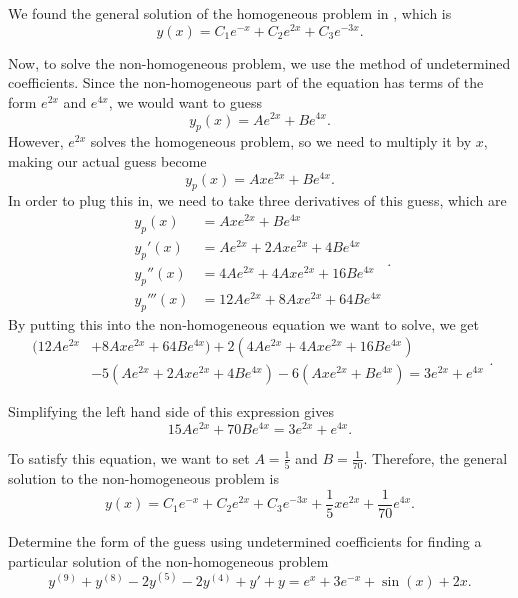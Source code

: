 \documentclass{ximera}
\begin{document}
\begin{exampleSol}
    We found the general solution of the homogeneous problem in , which is 
    \[ 
        y(x) = C_1 e^{-x} + C_2 e^{2x}+ C_3e^{-3x}. 
    \]
    
    Now, to solve the non-homogeneous problem, we use the method of undetermined coefficients. Since the non-homogeneous part of the equation has terms of the form $e^{2x}$ and $e^{4x}$, we would want to guess 
    \[ 
        y_p(x) = Ae^{2x} + Be^{4x}.
    \] 
    However, $e^{2x}$ solves the homogeneous problem, so we need to multiply it by $x$, making our actual guess become 
    \[ 
        y_p(x) = Axe^{2x} + Be^{4x}.
    \] 
    In order to plug this in, we need to take three derivatives of this guess, which are
    \[ 
        \begin{split}
            y_p(x) &= Axe^{2x} + Be^{4x} \\
            y_p'(x) &= Ae^{2x} + 2Axe^{2x} + 4Be^{4x} \\
            y_p''(x) &= 4Ae^{2x} + 4Axe^{2x} + 16Be^{4x} \\
            y_p'''(x) &= 12Ae^{2x} + 8Axe^{2x} + 64Be^{4x}
        \end{split}.
    \]
    By putting this into the non-homogeneous equation we want to solve, we get
    \[
        \begin{split}
            (12Ae^{2x} &+ 8Axe^{2x} + 64Be^{4x}) + 2(4Ae^{2x} + 4Axe^{2x} + 16Be^{4x})\\
             & - 5(Ae^{2x} + 2Axe^{2x} + 4Be^{4x}) - 6(Axe^{2x} + Be^{4x} ) = 3e^{2x} + e^{4x}
        \end{split}.
    \]
    
    Simplifying the left hand side of this expression gives
    \[ 
        15Ae^{2x} + 70Be^{4x} = 3e^{2x} + e^{4x}. 
    \]
    
    To satisfy this equation, we want to set $A = \frac{1}{5}$ and $B = \frac{1}{70}$. Therefore, the general solution to the non-homogeneous problem is
    \[ 
        y(x) = C_1 e^{-x} + C_2 e^{2x}+ C_3e^{-3x} + \frac{1}{5}xe^{2x} + \frac{1}{70}e^{4x}. 
    \]
\end{exampleSol}

\begin{example}
    Determine the form of the guess using undetermined coefficients for finding a particular solution of the non-homogeneous problem
    \[ 
        y^{(9)} + y^{(8)} - 2y^{(5)} - 2y^{(4)} + y' + y = e^{x} + 3e^{-x} + \sin(x) + 2x. 
    \]
\end{example}
\end{document}
